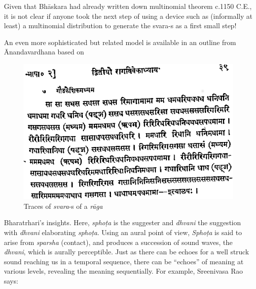 Given that Bhāskara had already written down multinomial theorem c.1150 C.E., it is not clear if anyone took the next step of using a device such as (informally at least) a multinomial distribution to generate the svara-s as a first small step!

An even more sophisticated but related model is available in an outline from Ānandavardhana based on 
\begin{figure}[H]
\centering
\includegraphics[scale=.85]{figures/6.eps}
\caption{Traces of \textsl{svara}-s of a \textsl{rāga}}\label{chap3-fig4}
\end{figure}

Bharatrhari’s insights. Here, \textsl{sphoṭa} is the suggester and \textsl{dhvani} the suggestion with \textsl{dhvani} elaborating \textsl{sphoṭa}. Using an aural point of view, \textsl{Sphoṭa} is said to arise from \textsl{sparsha} (contact), and produces a succession of sound waves, the \textsl{dhvani}, which is aurally perceptible. Just as there can be echoes for a well struck sound reaching us in a temporal sequence, there can be “echoes” of meaning at various levels, revealing the meaning sequentially. For example, Sreenivasa Rao says:

